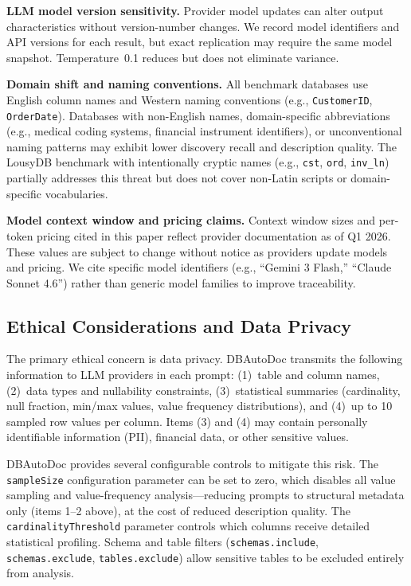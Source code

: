 \documentclass[twocolumn]{svjour3}
\begin{document}
\textbf{LLM model version sensitivity.} Provider model updates can alter output characteristics without version-number changes. We record model identifiers and API versions for each result, but exact replication may require the same model snapshot. Temperature~0.1 reduces but does not eliminate variance.

\textbf{Domain shift and naming conventions.} All benchmark databases use English column names and Western naming conventions (e.g., \texttt{CustomerID}, \texttt{OrderDate}). Databases with non-English names, domain-specific abbreviations (e.g., medical coding systems, financial instrument identifiers), or unconventional naming patterns may exhibit lower discovery recall and description quality. The LousyDB benchmark with intentionally cryptic names (e.g., \texttt{cst}, \texttt{ord}, \texttt{inv\_ln}) partially addresses this threat but does not cover non-Latin scripts or domain-specific vocabularies.

\textbf{Model context window and pricing claims.} Context window sizes and per-token pricing cited in this paper reflect provider documentation as of Q1 2026. These values are subject to change without notice as providers update models and pricing. We cite specific model identifiers (e.g., ``Gemini 3 Flash,'' ``Claude Sonnet 4.6'') rather than generic model families to improve traceability.

\subsection{Ethical Considerations and Data Privacy}

The primary ethical concern is data privacy. DBAutoDoc transmits the following information to LLM providers in each prompt: (1)~table and column names, (2)~data types and nullability constraints, (3)~statistical summaries (cardinality, null fraction, min/max values, value frequency distributions), and (4)~up to 10 sampled row values per column. Items (3) and (4) may contain personally identifiable information (PII), financial data, or other sensitive values.

DBAutoDoc provides several configurable controls to mitigate this risk. The \texttt{sampleSize} configuration parameter can be set to zero, which disables all value sampling and value-frequency analysis---reducing prompts to structural metadata only (items 1--2 above), at the cost of reduced description quality. The \texttt{cardinalityThreshold} parameter controls which columns receive detailed statistical profiling. Schema and table filters (\texttt{schemas.include}, \texttt{schemas.exclude}, \texttt{tables.exclude}) allow sensitive tables to be excluded entirely from analysis.
\end{document}
